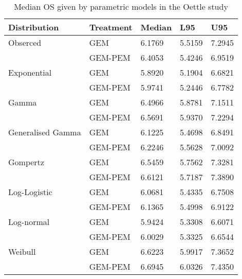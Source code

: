\begin{table}
    \center
    \begin{tabular}{lllll}
    \hline
    Distribution      & Treatment & Median & L95    & U95    \\ \hline
    Obserced          & GEM       & 6.1769 & 5.5159 & 7.2945 \\
                      & GEM-PEM   & 6.4053 & 5.4246 & 6.9519 \\ \hline
    Exponential       & GEM       & 5.8920 & 5.1904 & 6.6821 \\
                      & GEM-PEM   & 5.9741 & 5.2446 & 6.7782 \\
    Gamma             & GEM       & 6.4966 & 5.8781 & 7.1511 \\
                      & GEM-PEM   & 6.5691 & 5.9370 & 7.2294 \\
    Generalised Gamma & GEM       & 6.1225 & 5.4698 & 6.8491 \\
                      & GEM-PEM   & 6.2246 & 5.5628 & 7.0092 \\
    Gompertz          & GEM       & 6.5459 & 5.7562 & 7.3281 \\
                      & GEM-PEM   & 6.6121 & 5.7187 & 7.3890 \\
    Log-Logistic      & GEM       & 6.0681 & 5.4335 & 6.7508 \\
                      & GEM-PEM   & 6.1365 & 5.4998 & 6.9122 \\
    Log-normal        & GEM       & 5.9424 & 5.3308 & 6.6071 \\
                      & GEM-PEM   & 6.0029 & 5.3325 & 6.6544 \\
    Weibull           & GEM       & 6.6223 & 5.9917 & 7.3652 \\
                      & GEM-PEM   & 6.6945 & 6.0326 & 7.4350 \\ \hline
    \end{tabular}
    \caption{Median OS given by parametric models in the Oettle study}
    \label{oettleModelMedians}
\end{table}

